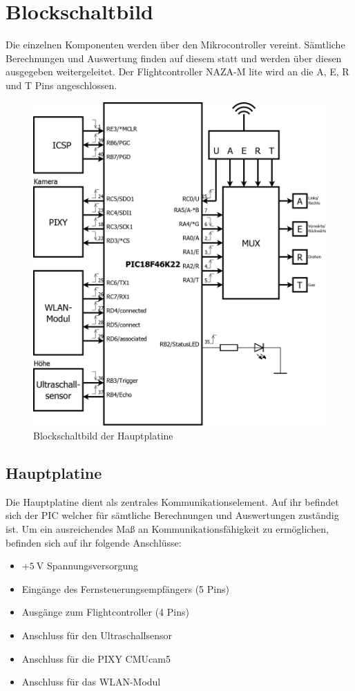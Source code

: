 \section{Blockschaltbild}
Die einzelnen Komponenten werden über den Mikrocontroller vereint. Sämtliche Berechnungen und Auswertung finden auf diesem statt und werden über diesen ausgegeben \bzw
weitergeleitet. Der Flightcontroller NAZA-M lite wird an die A, E, R und T Pins angeschlossen.
\begin{figure}[H]
  \begin{centering}
    \includegraphics[width = 1\textwidth]{Bilder/Blockschaltbild}
  \par\end{centering}
  \caption{Blockschaltbild der Hauptplatine}
  \label{Blockschaltbild}
\end{figure}

  \subsection{Hauptplatine}
  Die Hauptplatine dient als zentrales Kommunikationselement. Auf ihr befindet sich der PIC welcher für sämtliche Berechnungen und Auswertungen zuständig ist.
  Um ein ausreichendes Maß an Kommunikationsfähigkeit zu ermöglichen, befinden sich auf ihr folgende Anschlüsse:
  \begin{itemize}
    \item $+\SI{5}{\volt}$ Spannungsversorgung
    \item Eingänge des Fernsteuerungsempfängers (5 Pins)
    \item Ausgänge zum Flightcontroller (4 Pins)
    \item Anschluss für den Ultraschallsensor
    \item Anschluss für die PIXY CMUcam5
    \item Anschluss für das WLAN-Modul
  \end{itemize}

